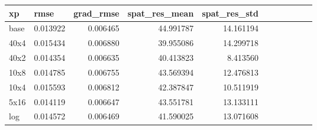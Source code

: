 \begin{tabular}{llrrrrrrrrr}
\toprule
            xp &        rmse &   grad\_rmse &    spat\_res\_mean &  spat\_res\_std &   \\
\midrule
     base &   0.013922 &    0.006465 &         44.991787 &     14.161194 &       \\
     40x4 &   0.015434 &    0.006880 &         39.955086 &     14.299718 &       \\
     40x2 &   0.014354 &    0.006635 &         40.413823 &      8.413560 &       \\
     10x8 &   0.014785 &    0.006755 &         43.569394 &     12.476813 &       \\
     10x4 &   0.015593 &    0.006812 &         42.387847 &     10.511919 &       \\
     5x16 &   0.014119 &    0.006647 &         43.551781 &     13.133111 &       \\
      log &   0.014572 &    0.006469 &         41.590025 &     13.071608 &       \\
\bottomrule
\end{tabular}
